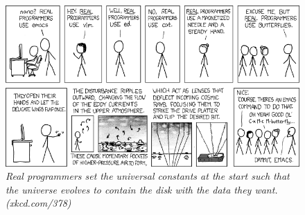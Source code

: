 \vfill

\begin{figure}[h!]
\centering
\includegraphics[width=\linewidth]{img/xkcd/real_programmers.png}
\caption*{{\small \textit{Real programmers set the universal constants at the start such that the universe evolves to contain the disk with the data they want. (xkcd.com/378)}}}
\end{figure}
